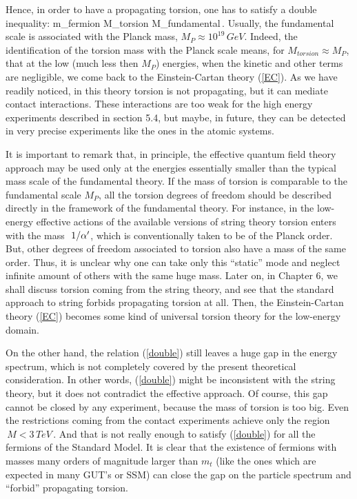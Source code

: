 Hence, in order to have a propagating torsion,
one has to satisfy a double inequality:
\beq
m_{fermion} \ll M_{torsion} \ll M_{fundamental}\,.
\label{double}
\eeq
Usually, the fundamental scale is associated with the Planck 
mass, $M_{P} \approx 10^{19}\,GeV$. Indeed, the identification 
of the torsion mass with the Planck scale means, for 
$M_{torsion}\approx M_P$, that at the
low (much less then $M_P$) energies, when the kinetic and other 
terms are negligible, we come back to the Einstein-Cartan theory
(\ref{EC}). As we have readily noticed, in this theory torsion 
is not propagating, but it can mediate contact interactions. 
These interactions are too weak for the high energy experiments
described in section 5.4, but maybe, in future, they can be 
detected in very precise experiments like the ones in 
the atomic systems.

It is important to remark that, in principle, 
the effective quantum field theory approach may be used only 
at the energies
essentially smaller than the typical mass scale of the
fundamental theory. If the mass of torsion is comparable
to the fundamental scale $M_P$, all the torsion degrees of 
freedom should be described directly in the framework of the 
fundamental theory. For instance, in the low-energy effective 
actions of the available versions of string theory torsion 
enters with the mass $\,\,1/\alpha^{\prime}$, which is conventionally 
taken to be of the Planck order. But, other degrees of freedom
associated to torsion also have a mass of the same order.
Thus, it is unclear why one can take only this ``static''
mode and neglect infinite amount of others with the same huge 
mass. Later on, in Chapter 6, we shall discuss torsion coming 
from the string theory, and see that the standard approach 
to string forbids propagating torsion at all. Then, the 
Einstein-Cartan theory (\ref{EC}) becomes some kind of 
universal torsion theory for the low-energy domain. 

On the other hand, the relation (\ref{double}) still leaves a
huge gap in the energy spectrum, which is not completely
covered by the present theoretical consideration. In other 
words, (\ref{double}) might be inconsistent with the string 
theory, but it does not contradict the effective approach.  
Of course, this gap cannot be closed by any experiment, because
the mass of torsion is too big. Even the restrictions coming
from the contact experiments \cite{betor} achieve only the
region $\,M < 3 \,TeV\,$. And that is not really enough to 
satisfy (\ref{double}) for all the fermions
of the Standard Model. It is clear that the existence of
fermions with masses many orders of magnitude 
larger than $m_t$ (like the
ones which are expected in many GUT's or SSM) can close the gap
on the particle spectrum and ``forbid'' propagating torsion.

